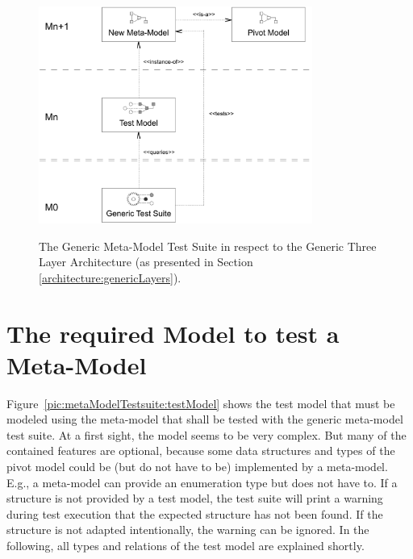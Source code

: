 \begin{figure}[!t]
	\centering
		\includegraphics[width=0.80\textwidth]{figures/metamodeltestsuite/genericTestSuite.pdf}
	\label{pic:metaModelTestsuite:genericTestSuite}
	\caption{The Generic Meta-Model Test Suite in respect to the Generic Three Layer Ar\-chi\-tec\-ture (as presented in Section \ref{architecture:genericLayers}).}
\end{figure}



\section{The required Model to test a Meta-Model}

Figure~\ref{pic:metaModelTestsuite:testModel} shows the test model that must be
modeled using the meta-model that shall be tested with the generic meta-model 
test suite. At a first sight, the model seems to be very complex. But many of 
the contained features are optional, because some data structures and types of 
the pivot model could be (but do not have to be) implemented by a meta-model. 
E.g., a meta-model can provide an enumeration type but does not have to. If a 
structure is not provided by a test model, the test suite will print a warning 
during test execution that the expected structure has not been found. If the 
structure is not adapted intentionally, the warning can be ignored. In the 
following, all types and relations of the test model are explained shortly.

